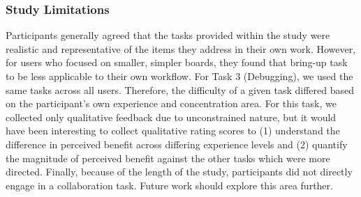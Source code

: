 \documentclass [11pt, proquest] {uwthesis}[2020/02/24]
\begin{document}
    
\subsubsection{Study Limitations}    

Participants generally agreed that the tasks provided within the study were realistic and representative of the items they address in their own work. However, for users who focused on smaller, simpler boards, they found that bring-up task to be less applicable to their own workflow. For Task 3 (Debugging), we used the same tasks across all users. Therefore, the difficulty of a given task differed  based on the participant's own experience and concentration area. For this task, we collected only qualitative feedback due to unconstrained nature, but it would have been interesting to collect qualitative rating scores to (1) understand the difference in perceived benefit across differing experience levels and (2) quantify the magnitude of perceived benefit against the other tasks which were more directed. Finally, because of the length of the study, participants did not directly engage in a collaboration task. Future work should explore this area further.

    
\end{document}
